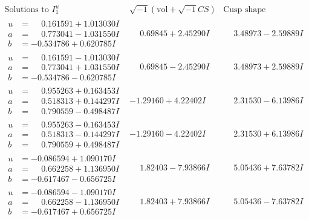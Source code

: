\documentclass[1p]{elsarticle_modified}
\theoremstyle{definition}
\newcommand{\I}{\sqrt{-1}}
\begin{document}
$$\begin{array}{c|c|c}  
\text{Solutions to }I^u_{1}& \I (\text{vol} + \sqrt{-1}CS) & \text{Cusp shape}\\
 \hline 
\begin{aligned}
u &= \phantom{-}0.161591 + 1.013030 I \\
a &= \phantom{-}0.773041 - 1.031550 I \\
b &= -0.534786 + 0.620785 I\end{aligned}
 & \phantom{-}0.69845 + 2.45290 I & \phantom{-}3.48973 - 2.59889 I \\ \hline\begin{aligned}
u &= \phantom{-}0.161591 - 1.013030 I \\
a &= \phantom{-}0.773041 + 1.031550 I \\
b &= -0.534786 - 0.620785 I\end{aligned}
 & \phantom{-}0.69845 - 2.45290 I & \phantom{-}3.48973 + 2.59889 I \\ \hline\begin{aligned}
u &= \phantom{-}0.955263 + 0.163453 I \\
a &= \phantom{-}0.518313 + 0.144297 I \\
b &= \phantom{-}0.790559 - 0.498487 I\end{aligned}
 & -1.29160 + 4.22402 I & \phantom{-}2.31530 - 6.13986 I \\ \hline\begin{aligned}
u &= \phantom{-}0.955263 - 0.163453 I \\
a &= \phantom{-}0.518313 - 0.144297 I \\
b &= \phantom{-}0.790559 + 0.498487 I\end{aligned}
 & -1.29160 - 4.22402 I & \phantom{-}2.31530 + 6.13986 I \\ \hline\begin{aligned}
u &= -0.086594 + 1.090170 I \\
a &= \phantom{-}0.662258 + 1.136950 I \\
b &= -0.617467 - 0.656725 I\end{aligned}
 & \phantom{-}1.82403 - 7.93866 I & \phantom{-}5.05436 + 7.63782 I \\ \hline\begin{aligned}
u &= -0.086594 - 1.090170 I \\
a &= \phantom{-}0.662258 - 1.136950 I \\
b &= -0.617467 + 0.656725 I\end{aligned}
 & \phantom{-}1.82403 + 7.93866 I & \phantom{-}5.05436 - 7.63782 I \\ \hline\begin{aligned}

\end{aligned}
\end{array}$$
\end{document}
